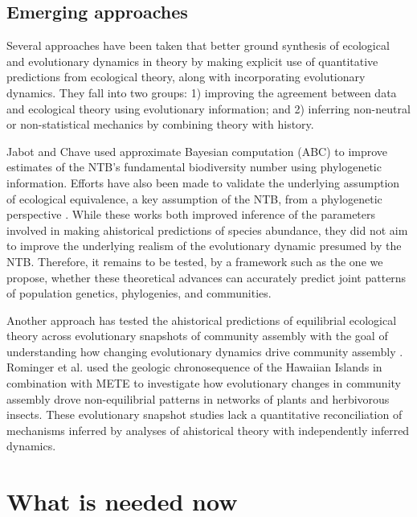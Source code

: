 \documentclass[12pt]{article}
\begin{document}
\subsection{Emerging approaches}

Several approaches have been taken that better ground synthesis of
ecological and evolutionary dynamics in theory by making
explicit use of quantitative predictions from ecological theory,
along with incorporating evolutionary dynamics. They
fall into two groups: 1) improving the agreement between data and
ecological theory using evolutionary information; and 2) inferring
non-neutral or non-statistical mechanics by combining theory with
history. 

Jabot and Chave \citep{Jabot2009-xr} used approximate Bayesian
computation (ABC) to improve estimates of the NTB's fundamental
% 
% 
biodiversity number using phylogenetic information. Efforts have also
been made to validate the underlying assumption of ecological
equivalence, a key assumption of the NTB, from a phylogenetic
perspective \citep{Burbrink2015-vx}. While these works both improved
inference of the parameters involved in making ahistorical predictions
of species abundance, they did not aim to improve the underlying
realism of the evolutionary dynamic presumed by the NTB. Therefore, it remains to be tested, by a
framework such as the one we propose, whether these theoretical
advances can accurately predict joint patterns of population genetics,
phylogenies, and communities.

Another approach has tested the ahistorical predictions of equilibrial
ecological theory across evolutionary snapshots of community assembly
with the goal of understanding how changing evolutionary dynamics
drive community assembly \citep{Olszewski2004-ud,
  Wagner2006-te}. Rominger et
al. \citep{Rominger2015-kb} used the geologic chronosequence of the
Hawaiian Islands in combination with METE to investigate how
evolutionary changes in community assembly drove non-equilibrial
patterns in networks of plants and herbivorous insects.  These evolutionary snapshot studies lack a
quantitative reconciliation of mechanisms inferred by analyses of
ahistorical theory with independently inferred dynamics. 

\section{What is needed now}
\end{document}
